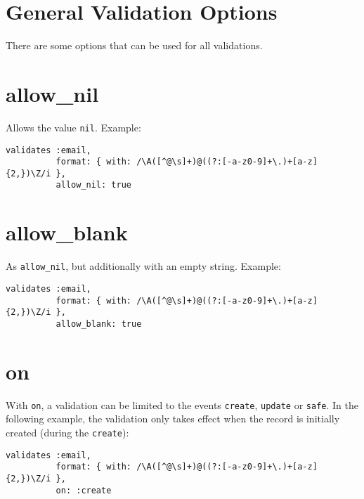 \documentclass[a4paper]{book}
\begin{document}
\section{General Validation Options}\label{general-validation-options}

There are some options that can be used for all validations.

\section{allow\_nil}\label{allowux5fnil}

Allows the value \texttt{nil}. Example:

\begin{shaded}\begin{verbatim}
validates :email,
          format: { with: /\A([^@\s]+)@((?:[-a-z0-9]+\.)+[a-z]{2,})\Z/i },
          allow_nil: true
\end{verbatim}\end{shaded}

\section{allow\_blank}\label{allowux5fblank}

As \texttt{allow\_nil}, but additionally with an empty string. Example:

\begin{shaded}\begin{verbatim}
validates :email,
          format: { with: /\A([^@\s]+)@((?:[-a-z0-9]+\.)+[a-z]{2,})\Z/i },
          allow_blank: true
\end{verbatim}\end{shaded}

\section{on}\label{on}

With \texttt{on}, a validation can be limited to the events \texttt{create}, \texttt{update} or \texttt{safe}. In the following example, the validation only takes effect when the record is initially created (during the \texttt{create}):

\begin{shaded}\begin{verbatim}
validates :email,
          format: { with: /\A([^@\s]+)@((?:[-a-z0-9]+\.)+[a-z]{2,})\Z/i },
          on: :create
\end{verbatim}\end{shaded}
\end{document}
